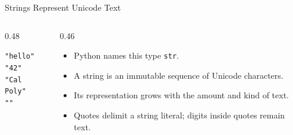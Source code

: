 \documentclass[aspectratio=169,10pt]{beamer}
\begin{document}
\begin{frame}{Strings Represent Unicode Text}

  \begin{columns}[T,onlytextwidth]

    \begin{column}{0.48\textwidth}

      \begin{center}

        {\Large \texttt{"hello"}}\\[0.12in]
        {\Large \texttt{"42"}}\\[0.12in]
        {\Large \texttt{"Cal Poly"}}\\[0.12in]
        {\Large \texttt{""}}

      \end{center}

    \end{column}

    \begin{column}{0.46\textwidth}

      \begin{itemize}

        \item Python names this type \texttt{str}.

        \item A string is an immutable sequence of Unicode characters.

        \item Its representation grows with the amount and kind of text.

        \item Quotes delimit a string literal; digits inside quotes remain text.

      \end{itemize}

    \end{column}

  \end{columns}


\end{frame}
\end{document}
